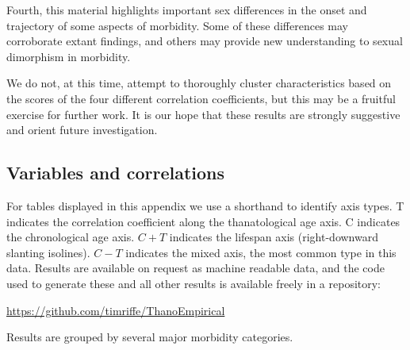 \documentclass[11pt,oneside,a4paper]{article}
\begin{document}
Fourth,
this material highlights important sex differences in the onset and trajectory
of some aspects of morbidity. Some of these differences may
corroborate extant findings, and others may provide new understanding to sexual dimorphism in
morbidity. 

We do not, at this time, attempt to thoroughly cluster
characteristics based on the scores of the four different correlation
coefficients, but this may be a fruitful exercise for further work. It is our hope that these results are strongly suggestive and orient
future investigation.


   
%  

%
\begin{appendices}
\section{Variables and correlations}



\end{appendices}

For tables displayed in this appendix we use a shorthand to identify axis types.
T indicates the correlation coefficient along the thanatological age axis. C
indicates the chronological age axis. $C+T$ indicates the lifespan axis
(right-downward slanting isolines). $C-T$ indicates the mixed axis, the
most common type in this data. Results are available on request as machine
readable data, and the code used to generate these and all other results is
available freely in a repository: 

\url{https://github.com/timriffe/ThanoEmpirical}

Results are grouped by several major morbidity categories. 

\listoftables
\end{document}
